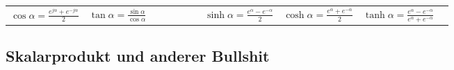 \begin{minipage}{12.5cm}
\begin{tabular}{lllllll}
      $\cos{\alpha} = \frac{e^{j\alpha} + e^{-j\alpha}}{2}$ &
      
      $\tan{\alpha} = \frac{\sin \alpha}{\cos \alpha}$ &
      
      $ \qquad \qquad $ &
      
      $\sinh{\alpha} = \frac{e^\alpha - e^{-\alpha}}{2} $ &
      
      $\cosh{\alpha} = \frac{e^\alpha + e^{-\alpha}}{2} $ &
      
      $\tanh{\alpha} = \frac{e^\alpha - e^{-\alpha}}{e^\alpha + e^{-\alpha}}$
    \end{tabular}    
\end{minipage}
  \subsection{Skalarprodukt und anderer Bullshit}
